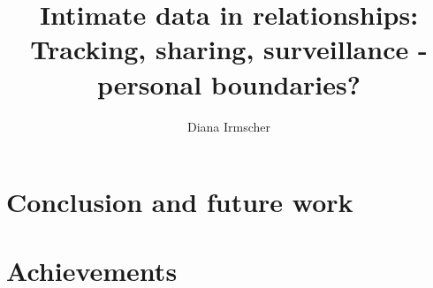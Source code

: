 \documentclass[journal]{vgtc}                %
\title{Intimate data in relationships: Tracking, sharing, surveillance - personal boundaries?}
\author{Diana Irmscher}
\begin{document}

\maketitle

%
%










\section{Conclusion and future work}
\label{sec:conculsion}
\section{Achievements}

\printbibliography
\end{document}
